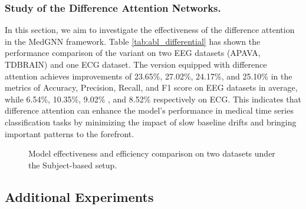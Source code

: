 \subsubsection{Study of the Difference Attention Networks.} In this section, we aim to investigate the effectiveness of the difference attention in the MedGNN framework. Table \ref{tab:abl_differential} has shown the performance comparison of the variant on two EEG datasets (APAVA, TDBRAIN) and one ECG dataset. The version equipped with difference attention achieves improvements of 23.65\%, 27.02\%, 24.17\%, and 25.10\% in the metrics of Accuracy, Precision, Recall, and F1 score on EEG datasets in average, while 6.54\%, 10.35\%, 9.02\% , and 8.52\% respectively on ECG. 
This indicates that difference attention can enhance the model's performance in medical time series classification tasks by minimizing the impact of slow baseline drifts and bringing important patterns to the forefront. %



\begin{figure}[!h]
    \vspace{-3mm}
    \centering
    \vspace{-4mm}
    \caption{Model effectiveness and efficiency comparison on two datasets under the Subject-based setup.}
    \label{fig:efficiency}
    \vspace{-4mm}
\end{figure}

\vspace{-1mm}
\subsection{Additional Experiments}


